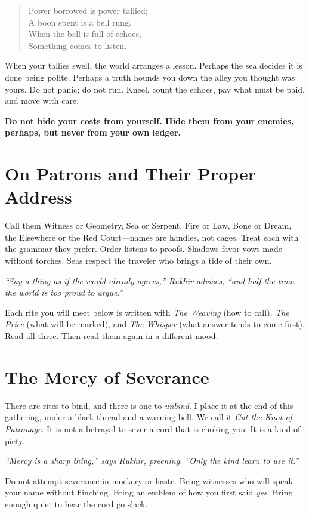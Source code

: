 \documentclass[12pt,twoside]{book}
\newcommand{\shadow}[1]{\textit{#1}}
\newcommand{\whisper}[1]{\textbf{#1}}
\begin{document}
\begin{verse}
Power borrowed is power tallied; \\
A boon spent is a bell rung. \\
When the bell is full of echoes, \\
Something comes to listen.
\end{verse}

When your tallies swell, the world arranges a lesson. Perhaps the sea decides it is done being polite. Perhaps a truth hounds you down the alley you thought was yours. Do not panic; do not run. Kneel, count the echoes, pay what must be paid, and move with care.

\whisper{Do not hide your costs from yourself. Hide them from your enemies, perhaps, but never from your own ledger.}

\section*{On Patrons and Their Proper Address}
Call them Witness or Geometry, Sea or Serpent, Fire or Law, Bone or Dream, the Elsewhere or the Red Court—names are handles, not cages. Treat each with the grammar they prefer. Order listens to proofs. Shadows favor vows made without torches. Seas respect the traveler who brings a tide of their own.

\shadow{``Say a thing as if the world already agrees,'' Rukhir advises, ``and half the time the world is too proud to argue.''}

Each rite you will meet below is written with \emph{The Weaving} (how to call), \emph{The Price} (what will be marked), and \emph{The Whisper} (what answer tends to come first). Read all three. Then read them again in a different mood.

\section*{The Mercy of Severance}
There are rites to bind, and there is one to \emph{unbind}. I place it at the end of this gathering, under a black thread and a warning bell. We call it \emph{Cut the Knot of Patronage}. It is not a betrayal to sever a cord that is choking you. It is a kind of piety.

\shadow{``Mercy is a sharp thing,'' says Rukhir, preening. ``Only the kind learn to use it.''}

Do not attempt severance in mockery or haste. Bring witnesses who will speak your name without flinching. Bring an emblem of how you first said \emph{yes}. Bring enough quiet to hear the cord go slack.
\end{document}
